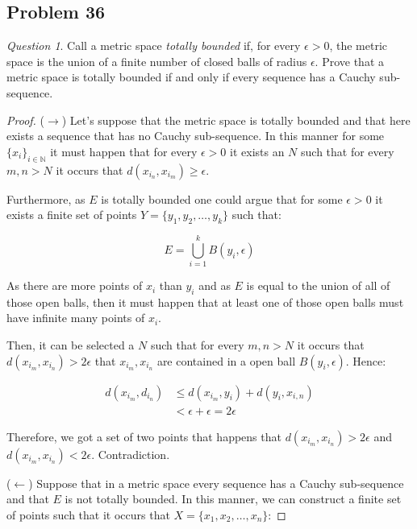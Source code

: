 \documentclass[11pt]{article}
\theoremstyle{definition}
\theoremstyle{remark}
\theoremstyle{remark}
\newtheorem{question}{Question}
\newcommand{\N}{\mathbb{N}}
\begin{document}
\subsection{Problem 36}
\begin{question}
  Call a metric space \textit{totally bounded} if, for every
  $\epsilon > 0$, the metric space is the union of a finite number of
  closed balls of radius $\epsilon$. Prove that a metric space is
  totally bounded if and only if every sequence has a Cauchy
  sub-sequence.
\end{question}

\begin{proof}
  ($\rightarrow$) Let's suppose that the metric space is totally
  bounded and that here exists a sequence that has no Cauchy
  sub-sequence. In this manner for some $\{x_i\}_{i \in \N}$ it must
  happen that for every $\epsilon > 0$ it exists an $N$ such
  that for every $m, n > N$ it occurs that
  $d(x_{i_n}, x_{i_m}) \ge \epsilon$.

  Furthermore, as $E$ is totally bounded one could argue that for
  some $\epsilon > 0$ it exists a finite set of points
  $Y = \{y_1, y_2, \dots, y_k\}$ such that:

  \begin{equation}
    E = \bigcup_{i=1}^kB(y_i, \epsilon)
  \end{equation}

  As there are more points of $x_i$ than $y_i$ and as $E$ is equal to
  the union of all of those open balls, then it must happen that at
  least one of those open balls must have infinite many points of
  $x_i$.

  Then, it can be selected a $N$ such that for every $m, n > N$ it
  occurs that $d(x_{i_m}, x_{i_n}) > 2\epsilon$ that
  $x_{i_m}, x_{i_n}$ are contained in a open ball $B(y_i,
    \epsilon)$. Hence:

  \begin{equation}
    \begin{split}
      d(x_{i_m}, d_{i_n}) &\le d(x_{i_m}, y_i) + d(y_i, x_{i,n}) \\
      &< \epsilon + \epsilon = 2\epsilon
    \end{split}
  \end{equation}

  Therefore, we got a set of two points that happens that
  $d(x_{i_m}, x_{i_n}) > 2\epsilon$ and
  $d(x_{i_m}, x_{i_n}) < 2\epsilon$. Contradiction.

  ($\leftarrow$) Suppose that in a metric space every sequence has a
  Cauchy sub-sequence and that $E$ is not totally bounded. In this
  manner, we can construct a finite set of points such that it occurs
  that $X = \{x_1, x_2, \dots, x_n\}$:


\end{proof}
\end{document}
